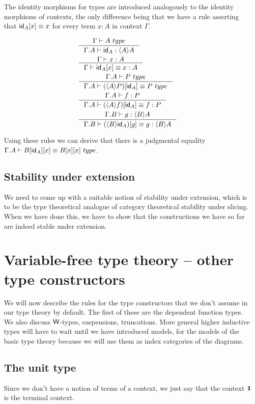 The identity morphisms for types are introduced analogously to the identity
morphisms of contexts, the only difference being that we have a rule asserting
that $\subst{x}{\idfunc[A]}\jdeq x$ for every term $x:A$ in context $\Gamma$.

\begin{align}
& \inference{\jtype{\Gamma}{A}}{\jterm{\ctxext{\Gamma}{A}}{\ctxwk{A}{A}}{\idfunc[A]}}\\
& \inference{\jterm{\Gamma}{A}{x}}{\jtermeq{\Gamma}{A}{\subst{x}{\idfunc[A]}}{x}}\\
& \inference{\jtype{\ctxext{\Gamma}{A}}{P}}{\jtypeeq{\ctxext{\Gamma}{A}}{\subst{\idfunc[A]}{\ctxwk{A}{P}}}{P}}\\
& \inference{\jterm{\ctxext{\Gamma}{A}}{P}{f}}{\jtermeq{\ctxext{\Gamma}{A}}{P}{\subst{\idfunc[A]}{\ctxwk{A}{f}}}{f}} \\
& \inference{\jterm{\ctxext{\Gamma}{B}}{\ctxwk{B}{A}}{g}}{\jtermeq{\ctxext{\Gamma}{B}}{\ctxwk{B}{A}}{\subst{g}{\ctxwk{B}{\idfunc[A]}}}{g}}
\end{align}

Using these rules we can derive that there is a judgmental equality $\jtypeeq{\ctxext{\Gamma}{A}}{\subst{x}{{\idfunc[A]}{B}}}
{\subst{x}{{x}{B}}}$.

\subsection{Stability under extension}
We need to come up with a suitable notion of stability under extension, which
is to be the type theoretical analogue of category theoretical stability under
slicing. When we have done this, we have to show that the constructions we have
so far are indeed stable under extension.



\section{Variable-free type theory -- other type constructors}
We will now describe the rules for the type constructors that we don't assume
in our type theory by default. The first of these are the dependent function
types. We also discuss $\mathsf{W}$-types, suspensions, truncations. More general higher inductive
types will have to wait until we have introduced models, for the models of the
basic type theory because we will use them as index categories of the diagrams.

\subsection{The unit type}
Since we don't have a notion of terms of a context, we just say that the context
$\mathbf{1}$ is the terminal context.


